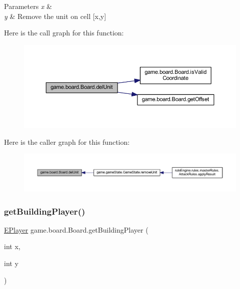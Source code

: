 \begin{DoxyParams}{Parameters}
{\em x} & \\
\hline
{\em y} & Remove the unit on cell \mbox{[}x,y\mbox{]} \\
\hline
\end{DoxyParams}
Here is the call graph for this function\+:
\nopagebreak
\begin{figure}[H]
\begin{center}
\leavevmode
\includegraphics[width=350pt]{classgame_1_1board_1_1_board_a580af354baf71be5405e6876dd78e3f6_cgraph}
\end{center}
\end{figure}
Here is the caller graph for this function\+:
\nopagebreak
\begin{figure}[H]
\begin{center}
\leavevmode
\includegraphics[width=350pt]{classgame_1_1board_1_1_board_a580af354baf71be5405e6876dd78e3f6_icgraph}
\end{center}
\end{figure}
\mbox{\label{classgame_1_1board_1_1_board_a26945d3e21a7033fa9d6b26d61425fe2}} 
\subsubsection{\texorpdfstring{get\+Building\+Player()}{getBuildingPlayer()}}
{\footnotesize\ttfamily \mbox{\hyperlink{enumgame_1_1_e_player}{E\+Player}} game.\+board.\+Board.\+get\+Building\+Player (\begin{DoxyParamCaption}\item[{int}]{x,  }\item[{int}]{y }\end{DoxyParamCaption})\hspace{0.3cm}{\ttfamily [inline]}}


